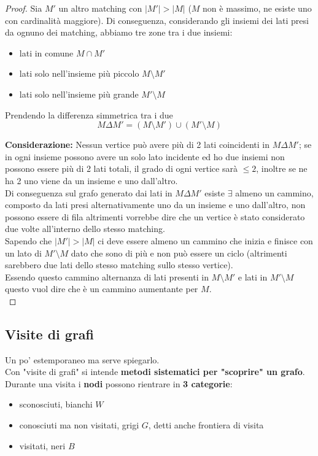 \begin{proof}
	Sia $M'$ un altro matching con $|M'| > |M|$ ($M$ non è massimo, ne esiste uno con cardinalità maggiore). Di conseguenza, considerando gli insiemi dei lati presi da ognuno dei matching, abbiamo tre zone tra i due insiemi: 
	\begin{itemize}
		\item lati in comune $M \cap M'$
		\item lati solo nell'insieme più piccolo $M \setminus M'$
		\item lati solo nell'insieme più grande $M' \setminus M$
	\end{itemize}
	
	Prendendo la differenza simmetrica tra i due
	$$ M \Delta M' = (M \setminus M') \cup (M' \setminus M)$$
	
	\textbf{Considerazione:} Nessun vertice può avere più di 2 lati coincidenti in $M \Delta M'$; se in ogni insieme possono avere un solo lato incidente ed ho due insiemi non possono essere più di 2 lati totali, il grado di ogni vertice sarà $\leq 2$, inoltre se ne ha 2 uno viene da un insieme e uno dall'altro. \\ 
	Di conseguenza sul grafo generato dai lati in $M \Delta M'$ esiste $\exists$ almeno un cammino, composto da lati presi alternativamente uno da un insieme e uno dall'altro, non possono essere di fila altrimenti vorrebbe dire che un vertice è stato considerato due volte all'interno dello stesso matching.\\
	Sapendo che $|M'| > |M|$ ci deve essere almeno un cammino che inizia e finisce con un lato di $M' \setminus M$ dato che sono di più e non può essere un ciclo (altrimenti sarebbero due lati dello stesso matching sullo stesso vertice). \\
	
	Essendo questo cammino alternanza di lati presenti in $M \setminus M'$ e lati in $M' \setminus M$ questo vuol dire che è un cammino aumentante per $M$.\\
\end{proof}

\newpage

\subsection*{Visite di grafi}
Un po' estemporaneo ma serve spiegarlo.\\

Con "visite di grafi" si intende \textbf{metodi sistematici per "scoprire" un grafo}. Durante una visita i \textbf{nodi} possono rientrare in \textbf{3 categorie}:
\begin{itemize}
	\item sconosciuti, bianchi $W$ 
	\item conosciuti ma non visitati, grigi $G$, detti anche frontiera di visita
	\item visitati, neri $B$
\end{itemize}

